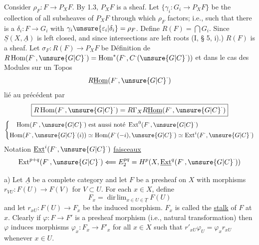 Consider $\rho_F:F\longrightarrow P_XF$. By 1.3, $P_XF$ is a sheaf. Let $\{\gamma_i:G_i\longrightarrow P_XF\}$ be the collection of all subsheaves of $P_XF$ through which $\rho_F$ factors; i.e., such that there is a $\delta_i:F\longrightarrow G_i$ with $\gamma_i\unsure{\varepsilon_i|\delta_i}=\rho_F$. Define $R(F)=\bigcap G_i$. Since
$\underline S(X,\underline A)$ is left closed, and since intersections are left roots (I, § 5, i).) $R(F)$ is a sheaf. Let $\sigma_F:R(F)\longrightarrow P_XF$ be
Définition de $R\operatorname{Hom}(F^\cdot,\unsure{G|C}^\cdot)=\operatorname{Hom}^*(F^\cdot,C^\cdot(\unsure{G|C}^\cdot))$
et dans le cas des Modules sur un Topos
\[
R\underline{\operatorname{Hom}}(F^\cdot,\unsure{G|C}^\cdot)
\]
lié au précédent par
\[
\boxed{R\operatorname{Hom}(F^\cdot,\unsure{G|C}^\cdot)=R\Gamma_X R\underline{\operatorname{Hom}}(F^\cdot,\unsure{G|C}^\cdot)}
\]
\[
\left\{\begin{aligned}
\operatorname{Hom}(F^\cdot,\unsure{G|C}^\cdot)&\text{ est aussi noté }\operatorname{Ext}^0(F^\cdot,\unsure{G|C}^\cdot)\\
\operatorname{Hom}(F^\cdot,\unsure{G|C}^\cdot(i))&\simeq\operatorname{Hom}(F^\cdot(-i),\unsure{G|C}^\cdot)\simeq\operatorname{Ext}^i(F^\cdot,\unsure{G|C}^\cdot)
\end{aligned}\right.
\]
Notation $\underline{\operatorname{Ext}}^i(F^\cdot,\unsure{G|C}^\cdot)$ \uline{faisceaux}
\[
\operatorname{Ext}^{p+q}(F^\cdot,\unsure{G|C}^\cdot)\Longleftarrow E_2^{pq}=H^p(X,\underline{\operatorname{Ext}}^q(F^\cdot,\unsure{G|C}^\cdot))
\]

a) Let $\underline{A}$ be a complete category and let $F$ be a presheaf on $X$ with morphisms $r_{VU}:F(U)\longrightarrow F(V)$ for $V\subset U$. For each $x\in X$, define
\[
F_x=\mathop{\mathrm{dir}\,\lim}_{x\in U\in\underline{T}}F(U)
\]
and let $r_{xU}:F(U)\longrightarrow F_x$ be the induced morphism. $F_x$ is called the \uline{stalk} of $F$ at $x$. Clearly if $\varphi:F\longrightarrow F'$ is a presheaf morphism (i.e., natural transformation) then $\varphi$ induces morphisms $\varphi_x:F_x\longrightarrow F'_x$ for all $x\in X$ such that $r'_{xU}\varphi_U=\varphi_xr_{xU}$ whenever $x\in U$.

